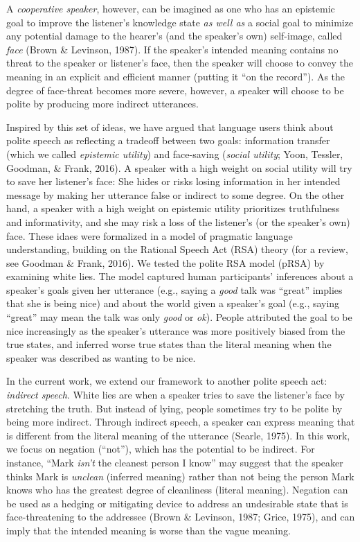 \documentclass[10pt, letterpaper]{article}
\begin{document}
A \emph{cooperative speaker}, however, can be imagined as one who has an
epistemic goal to improve the listener's knowledge state \emph{as well
as} a social goal to minimize any potential damage to the hearer's (and
the speaker's own) self-image, called \emph{face} (Brown \& Levinson,
1987). If the speaker's intended meaning contains no threat to the
speaker or listener's face, then the speaker will choose to convey the
meaning in an explicit and efficient manner (putting it ``on the
record''). As the degree of face-threat becomes more severe, however, a
speaker will choose to be polite by producing more indirect utterances.

Inspired by this set of ideas, we have argued that language users think
about polite speech as reflecting a tradeoff between two goals:
information transfer (which we called \emph{epistemic utility}) and
face-saving (\emph{social utility}; Yoon, Tessler, Goodman, \& Frank,
2016). A speaker with a high weight on social utility will try to save
her listener's face: She hides or risks losing information in her
intended message by making her utterance false or indirect to some
degree. On the other hand, a speaker with a high weight on epistemic
utility prioritizes truthfulness and informativity, and she may risk a
loss of the listener's (or the speaker's own) face. These idaes were
formalized in a model of pragmatic language understanding, building on
the Rational Speech Act (RSA) theory (for a review, see Goodman \&
Frank, 2016). We tested the polite RSA model (pRSA) by examining white
lies. The model captured human participants' inferences about a
speaker's goals given her utterance (e.g., saying a \emph{good} talk was
``great'' implies that she is being nice) and about the world given a
speaker's goal (e.g., saying ``great'' may mean the talk was only
\emph{good} or \emph{ok}). People attributed the goal to be nice
increasingly as the speaker's utterance was more positively biased from
the true states, and inferred worse true states than the literal meaning
when the speaker was described as wanting to be nice.

In the current work, we extend our framework to another polite speech
act: \emph{indirect speech}. White lies are when a speaker tries to save
the listener's face by stretching the truth. But instead of lying,
people sometimes try to be polite by being more indirect. Through
indirect speech, a speaker can express meaning that is different from
the literal meaning of the utterance (Searle, 1975). In this work, we
focus on negation (``not''), which has the potential to be indirect. For
instance, ``Mark \emph{isn't} the cleanest person I know'' may suggest
that the speaker thinks Mark is \emph{unclean} (inferred meaning) rather
than not being the person Mark knows who has the greatest degree of
cleanliness (literal meaning). Negation can be used as a hedging or
mitigating device to address an undesirable state that is
face-threatening to the addressee (Brown \& Levinson, 1987; Grice,
1975), and can imply that the intended meaning is worse than the vague
meaning.
\end{document}
